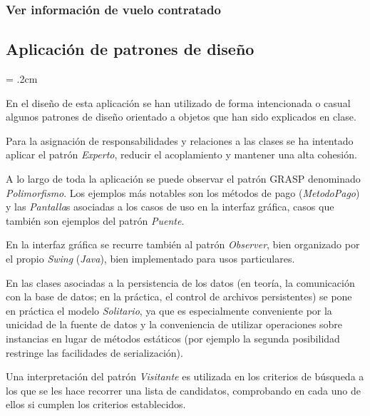 \documentclass[11pt, a4paper, twoside, titlepage]{article}
\begin{document}
			\subsubsection{Ver información de vuelo contratado}
				\begin{figure}[H]\centering
				\end{figure}

	\subsection{Aplicación de patrones de diseño}
		\parskip = .2cm

		En el diseño de esta aplicación \software se han utilizado de forma intencionada o casual algunos patrones de diseño orientado a objetos que han sido explicados en clase.

		Para la asignación de responsabilidades y relaciones a las clases se ha intentado aplicar el patrón \textit{Experto}, reducir el acoplamiento y 	mantener una alta cohesión.

		A lo largo de toda la aplicación se puede observar el patrón GRASP denominado \textit{Polimorfismo}. Los ejemplos más notables son los métodos de pago (\textit{MetodoPago}) y las \textit{Pantalla}s asociadas a los casos de uso en la interfaz gráfica, casos que también son ejemplos del patrón \textit{Puente}.

		En la interfaz gráfica se recurre también al patrón \textit{Observer}, bien organizado por el propio \textit{Swing} (\textit{Java}), bien implementado para usos particulares.

		En las clases asociadas a la persistencia de los datos (en teoría, la comunicación con la base de datos; en la práctica, el control de archivos persistentes) se pone en práctica el modelo \textit{Solitario}, ya que es especialmente conveniente por la unicidad de la fuente de datos y la conveniencia de utilizar operaciones sobre instancias en lugar de métodos estáticos (por ejemplo la segunda posibilidad restringe las facilidades de serialización).

		Una interpretación del patrón \textit{Visitante} es utilizada en los criterios de búsqueda a los que se les hace recorrer una lista de candidatos, comprobando en cada uno de ellos si cumplen los criterios establecidos.
\end{document}
